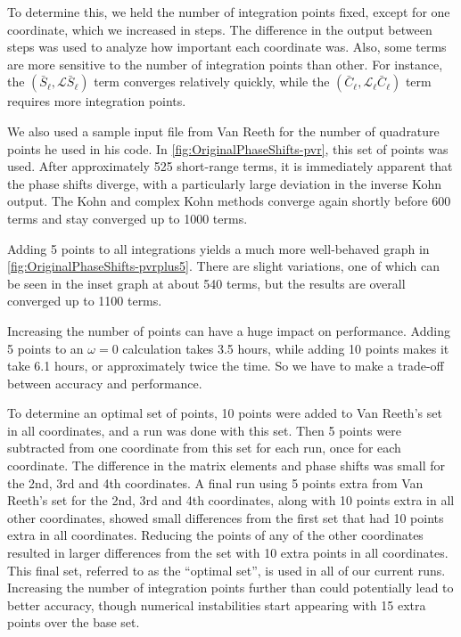 \documentclass[Dissertation.tex]{subfiles}
\begin{document}
To determine this, we held the number of integration points fixed, except for 
one coordinate, which we increased in steps. The difference in the output 
between steps was used to analyze how important each coordinate was. Also, 
some terms are more sensitive to the number of integration points than other. 
For instance, the $(\bar{S}_\ell,\mathcal{L} \bar{S}_\ell)$ term converges 
relatively quickly, while the $(\bar{C}_\ell,\mathcal{L}_\ell \bar{C}_\ell)$ 
term requires more integration points.

We also used a sample input file from Van Reeth for the number of quadrature 
points he used in his code. In \cref{fig:OriginalPhaseShifts-pvr}, this 
set of points was used. After approximately 525 short-range terms, it is 
immediately apparent that the phase shifts diverge, with a particularly large 
deviation in the inverse Kohn output. The Kohn and complex Kohn methods 
converge again shortly before 600 terms and stay converged up to 1000 terms.

Adding 5 points to all integrations yields a much more well-behaved graph in 
\cref{fig:OriginalPhaseShifts-pvrplus5}. There are slight variations, 
one of which can be seen in the inset graph at about 540 terms, but the 
results are overall converged up to 1100 terms.

Increasing the number of points can have a huge impact on performance. Adding 
5 points to an $\omega = 0$ calculation takes 3.5 hours, while adding 10 
points makes it take 6.1 hours, or approximately twice the time. So we have 
to make a trade-off between accuracy and performance.

To determine an optimal set of points, 10 points were added to Van Reeth's 
set in all coordinates, and a run was done with this set. Then 5 points were 
subtracted from one coordinate from this set for each run, once for each 
coordinate. The difference in the matrix elements and phase shifts was small 
for the 2nd, 3rd and 4th coordinates. A final run using 5 points extra from 
Van Reeth's set for the 2nd, 3rd and 4th coordinates, along with 10 points 
extra in all other coordinates, showed small differences from the first set 
that had 10 points extra in all coordinates. Reducing the points of any of 
the other coordinates resulted in larger differences from the set with 10 
extra points in all coordinates. This final set, referred to as the ``optimal 
set'', is used in all of our current runs. Increasing the number of 
integration points further than could potentially lead to better accuracy, 
though numerical instabilities start appearing with 15 extra points over the 
base set.
\end{document}
